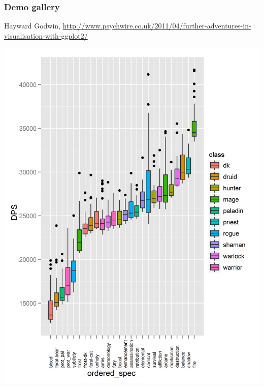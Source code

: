 \documentclass[compress]{beamer}\usepackage[]{graphicx}\usepackage[]{color}
\begin{document}
\begin{frame}[fragile]
\frametitle{Demo gallery}
Hayward Godwin, \footnotesize{\url{http://www.psychwire.co.uk/2011/04/further-adventures-in-visualisation-with-ggplot2/}}
\begin{center}
  \includegraphics[height=.6\textheight]{images/cool2.jpg}
\end{center}
\end{frame}
\end{document}
